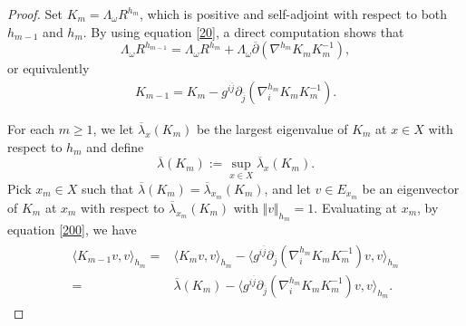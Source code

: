 \documentclass[11pt]{amsart}
\numberwithin{equation}{section}
\theoremstyle{remark}
\renewcommand{\bar}{\overline}
\newcommand{\pa}{\partial}
\newcommand{\lb}{\left (}
\newcommand{\rb}{\right )}
\begin{document}
\begin{proof}

Set $K_m=\Lambda_\omega R^{h_m}$, which is positive and self-adjoint with respect to both $h_{m-1}$ and $h_{m}$. By using equation \eqref{20}, a direct computation shows that
\[
\Lambda_\omega R^{h_{m-1}}=\Lambda_\omega R^{h_{m}}+\Lambda_\omega\bar\pa \lb \nabla^{h_m}K_m K_m^{-1}\rb,
\]
or equivalently
\begin{eqnarray}\label{200}
K_{m-1}=K_m-g^{i\bar j}\pa_{\bar j}\lb \nabla_i^{h_m}K_m K_m^{-1} \rb.
\end{eqnarray}

For each $m\geq 1$, we let $\bar\lambda_x\lb K_m\rb$ be the largest eigenvalue of $K_m$ at $x\in X$ with respect to $h_m$ and define \[\bar\lambda\lb K_m\rb :=\sup_{x\in X}\bar\lambda_x\lb K_m\rb.\]
Pick $x_m\in X$ such that $\bar\lambda\lb K_m\rb= \bar\lambda_{x_m}\lb K_m\rb$, and let $v\in E_{x_m}$ be an eigenvector of $K_m$ at $x_m$ with respect to $ \bar\lambda_{x_m}\lb K_m\rb$ with $\Vert v\Vert_{h_m}=1$. Evaluating at $x_m$, by equation \eqref{200}, we have
\begin{align}\label{300}
\begin{split}
\langle	K_{m-1}v,v\rangle_{h_m}=& \langle	K_{m}v,v\rangle_{h_m}- \langle g^{i\bar j}\pa_{\bar j}\lb \nabla_i^{h_m}K_m K_m^{-1} \rb v, v\rangle_{h_m} \\
=& \bar\lambda\lb K_m\rb- \langle g^{i\bar j}\pa_{\bar j}\lb \nabla_i^{h_m}K_m K_m^{-1} \rb v, v\rangle_{h_m}.
\end{split}
\end{align}



\end{proof}
\end{document}
